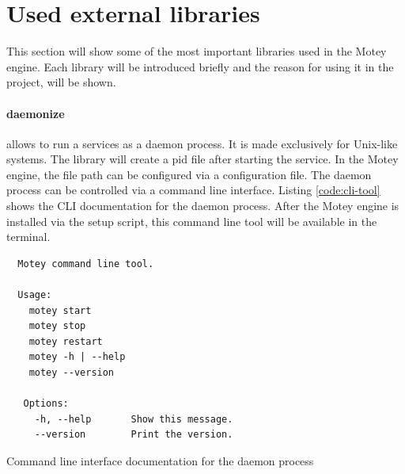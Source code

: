 \section{Used external libraries}
This section will show some of the most important libraries used in the Motey engine.
Each library will be introduced briefly and the reason for using it in the project, will be shown.

\paragraph{daemonize}\label{library:daemonize} allows to run a services as a daemon process.
It is made exclusively for Unix-like systems.
The library will create a pid file after starting the service.
In the Motey engine, the file path can be configured via a configuration file.
The daemon process can be controlled via a command line interface.
Listing \ref{code:cli-tool} shows the \ac{CLI} documentation for the daemon process.
After the Motey engine is installed via the setup script, this command line tool will be available in the terminal.

\begin{listing}[H]
  \begin{verbatim}
  Motey command line tool.

  Usage:
    motey start
    motey stop
    motey restart
    motey -h | --help
    motey --version

   Options:
     -h, --help       Show this message.
     --version        Print the version.
  \end{verbatim}
  \caption{Command line interface documentation for the daemon process}
  \label{code:cli-tool}
\end{listing}


